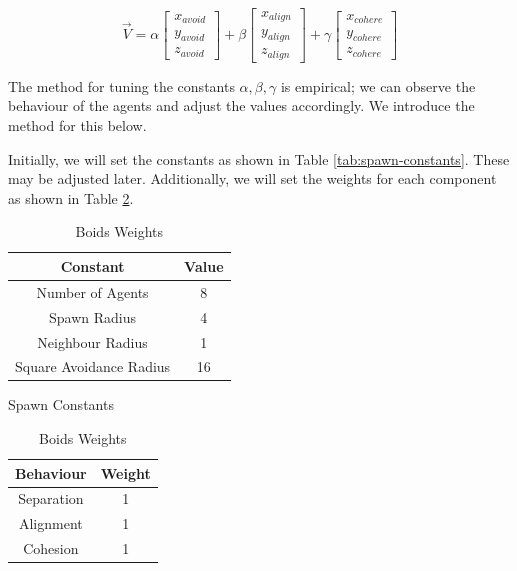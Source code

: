 \documentclass[12pt]{article}
\begin{document}
\begin{equation}
    \vec{V} = \alpha
    \begin{bmatrix}
    x_{avoid} \\
    y_{avoid} \\
    z_{avoid}
    \end{bmatrix}
    +
    \beta
    \begin{bmatrix}
    x_{align} \\
    y_{align} \\
    z_{align}
    \end{bmatrix}
    +
    \gamma
    \begin{bmatrix}
    x_{cohere} \\
    y_{cohere} \\
    z_{cohere}
    \end{bmatrix}
\end{equation}

The method for tuning the constants $\alpha, \beta, \gamma$ is empirical; we can observe the behaviour of the agents and adjust the values accordingly. We introduce the method for this below.

Initially, we will set the constants as shown in Table \ref{tab:spawn-constants}. These may be adjusted later. Additionally, we will set the weights for each component as shown in Table \ref{tab:boids-weights}.

\begin{table}[h]
    \begin{minipage}{0.45\textwidth}
        \centering
        \begin{tabular}{| c | c |} 
        \hline
        Constant & Value \\ 
        \hline\hline
        Number of Agents & 8 \\
        \hline
        Spawn Radius & 4 \\
        \hline
        Neighbour Radius & 1 \\
        \hline
        Square Avoidance Radius & 16 \\
        \hline
        \end{tabular}
        \caption{Spawn Constants}
        \label{tab:spawn-constants}
    \end{minipage}
    \hfill
    \begin{minipage}{0.45\textwidth}
        \centering
        \begin{tabular}{| c | c |} 
        \hline
        Behaviour & Weight \\ 
        \hline\hline
        Separation & 1 \\
        \hline
        Alignment & 1 \\
        \hline
        Cohesion & 1 \\
        \hline
        \end{tabular}
        \caption{Boids Weights}
        \label{tab:boids-weights}
    \end{minipage}
\end{table}
\end{document}
